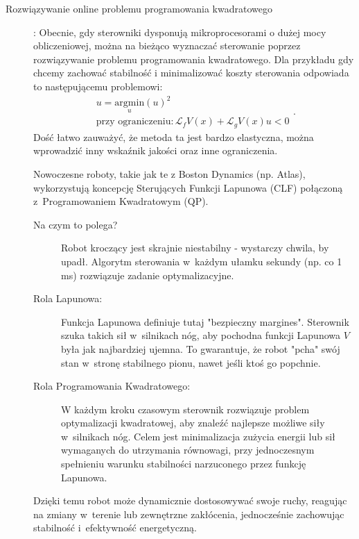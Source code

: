 \documentclass{article}
\begin{document}
\begin{description}
        \item[Rozwiązywanie online problemu programowania kwadratowego]:
        Obecnie, gdy sterowniki dysponują mikroprocesorami o dużej mocy obliczeniowej, można na bieżąco wyznaczać sterowanie poprzez rozwiązywanie problemu programowania kwadratowego.
        Dla przykładu gdy chcemy zachować stabilność i minimalizować koszty sterowania odpowiada to następującemu problemowi:
        $$
            \begin{array}{c}
                 u = \underset{u}{\mathrm{argmin}} (u)^{2}\\
                 \text{przy ograniczeniu:}\, \mathcal{L}_{f}V(x) + \mathcal{L}_{g}V(x)u < 0
            \end{array}.
        $$
        Dość łatwo zauważyć, że metoda ta jest bardzo elastyczna, można
        wprowadzić inny wskaźnik jakości oraz inne ograniczenia.
        

        \begin{tcolorbox}[colback=magenta!5, colframe=magenta!75!black, title=Zastosowanie w robotyce]
        Nowoczesne roboty, takie jak te z Boston Dynamics (np. Atlas),
        wykorzystują koncepcję Sterujących Funkcji Lapunowa (CLF) połączoną z~Programowaniem Kwadratowym (QP).

        \begin{description}
            \item[Na czym to polega?] Robot kroczący jest skrajnie niestabilny - wystarczy
            chwila, by upadł. Algorytm sterowania w~każdym ułamku sekundy (np. co 1
            ms) rozwiązuje zadanie optymalizacyjne.
            \item[Rola Lapunowa:] Funkcja Lapunowa definiuje tutaj "bezpieczny margines".
            Sterownik szuka takich sił w~silnikach nóg, aby pochodna funkcji Lapunowa $V$
            była jak najbardziej ujemna. To gwarantuje, że robot "pcha" swój stan
            w~stronę stabilnego pionu, nawet jeśli ktoś go popchnie.
            \item[Rola Programowania Kwadratowego:] W każdym kroku czasowym sterownik rozwiązuje
            problem optymalizacji kwadratowej, aby znaleźć najlepsze możliwe siły
            w~silnikach nóg.
            Celem jest minimalizacja zużycia energii lub sił wymaganych do
            utrzymania równowagi, przy jednoczesnym spełnieniu warunku stabilności
            narzuconego przez funkcję Lapunowa.
        \end{description}
        
        Dzięki temu robot może dynamicznie dostosowywać swoje ruchy, reagując na
        zmiany w~terenie lub zewnętrzne zakłócenia, jednocześnie zachowując
        stabilność
        i~efektywność energetyczną.
        \end{tcolorbox}
    \end{description}
    
\end{document}
